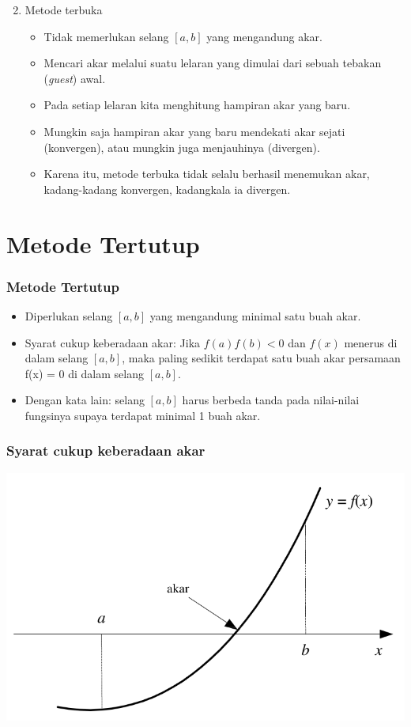 \documentclass[pdflatex,compress]{beamer}
\begin{document}
\begin{frame}
	\begin{enumerate}
		\setcounter{enumi}{1}
		\item Metode terbuka
		\begin{itemize}
			\item Tidak memerlukan selang $ [a, b] $ yang mengandung akar.
			\item Mencari akar melalui suatu lelaran yang dimulai
			dari sebuah tebakan (\textit{guest}) awal.
			\item Pada setiap lelaran kita menghitung hampiran akar yang baru.
			\item Mungkin saja hampiran akar yang baru mendekati akar sejati (konvergen), atau mungkin juga menjauhinya (divergen).
			\item Karena itu, metode terbuka tidak selalu berhasil menemukan akar, kadang-kadang konvergen, kadangkala ia divergen.
		\end{itemize}
	\end{enumerate}
\end{frame}

\section{Metode Tertutup}

\begin{frame}
	\frametitle{Metode Tertutup}
	\begin{itemize}
		\item Diperlukan selang $ [a, b] $ yang mengandung minimal satu buah akar.
		\item Syarat cukup keberadaan akar: Jika $ f(a) f(b) < 0 $ dan $ f(x) $ menerus di dalam selang $ [a, b] $, maka paling sedikit terdapat satu buah akar persamaan f(x) = 0 di dalam selang $ [a, b] $.
		\item Dengan kata lain: selang $ [a, b] $ harus berbeda tanda pada nilai-nilai fungsinya supaya terdapat minimal 1 buah akar.
	\end{itemize}
\end{frame}

\begin{frame}
	\frametitle{Syarat cukup keberadaan akar}
	\begin{center}
		\includegraphics[width=1\linewidth]{img/img01}
	\end{center}
\end{frame}
\end{document}
